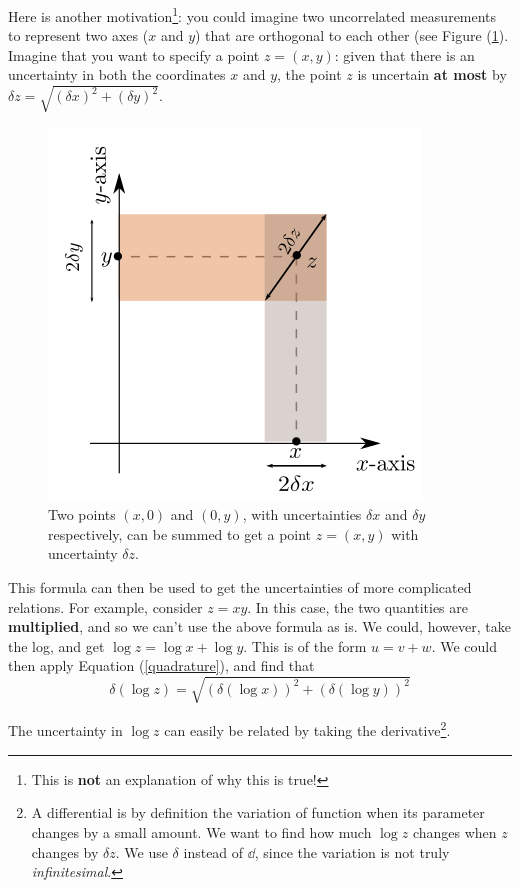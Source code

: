 Here is another motivation\footnote{This is \textbf{not} an explanation of why this is true!}: you could imagine two uncorrelated measurements to represent two axes ($x$ and $y$) that are orthogonal to each other (see Figure (\ref{fig:quadrature}). Imagine that you want to specify a point $z = (x,y)$: given that there is an uncertainty in both the coordinates $x$ and $y$, the point $z$ is uncertain \textbf{at most} by $\delta z = \sqrt{\left(\delta x\right)^2+\left(\delta y\right)^2}$.

\begin{figure}
    \centering
    \includegraphics[scale=0.5]{figs/quadrature.png}
    \caption{Two points $(x,0)$ and $(0,y)$, with uncertainties $\delta x$ and $\delta y$ respectively, can be summed to get a point $z=(x,y)$ with uncertainty $\delta z$. }
    \label{fig:quadrature}
\end{figure}

This formula can then be used to get the uncertainties of more complicated relations. For example, consider $z = xy$. In this case, the two quantities are \textbf{multiplied}, and so we can't use the above formula as is. We could, however, take the log, and get $\log{z} = \log{x} + \log{y}$. This is of the form $u = v + w$. We could then apply Equation (\ref{quadrature}), and find that $$\delta \left(\log{z}\right) = \sqrt{\left(\delta \left(\log{x}\right)\right)^2 + \left(\delta \left(\log{y}\right)\right)^2}$$

The uncertainty in $\log{z}$ can easily be related by taking the derivative\footnote{A differential is by definition the variation of function when its parameter changes by a small amount. We want to find how much $\log{z}$ changes when $z$ changes by $\delta z$. We use $\delta$ instead of $\dd$, since the variation is not truly \textit{infinitesimal}.}.

